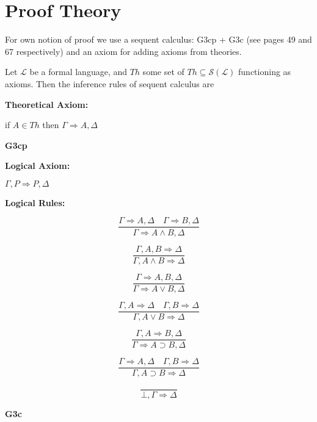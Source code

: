 \chapter{Proof Theory}\label{chapter:proof-theory}
For own notion of proof we use a sequent calculus: G3cp + G3c (see \cite{negri:2001} pages 49 and 67 respectively) and an axiom for adding axioms from theories.
\begin{definition}\label{def:Seq-Calc}
  \leanok
    Let $\mathcal{L}$ be a formal language, and $Th$ some set of $Th \subseteq \mathcal{S}(\mathcal{L})$ functioning as axioms. Then the inference rules of sequent calculus are

\noindent \textbf{Theoretical Axiom:}

if $A \in Th$ then $\Gamma \Rightarrow A, \Delta$

\begin{center}
    \textbf{G3cp}
\end{center}
\noindent \textbf{Logical Axiom:}

$\Gamma, P \Rightarrow P, \Delta$

\noindent \textbf{Logical Rules:}
\begin{multicols}{2}
\[
\frac{\Gamma \Rightarrow A, \Delta \quad \Gamma \Rightarrow B, \Delta}{\Gamma \Rightarrow A \land B, \Delta}\tag{$R\land$}
\]

\[
\frac{\Gamma, A, B \Rightarrow \Delta}{\Gamma, A \land B \Rightarrow \Delta}\tag{$L\land$}
\]

\[
\frac{\Gamma \Rightarrow A, B, \Delta}{\Gamma \Rightarrow A \lor B, \Delta}\tag{$R\lor$}
\]

\[
\frac{\Gamma, A \Rightarrow \Delta \quad \Gamma, B \Rightarrow \Delta}{\Gamma, A \lor B \Rightarrow \Delta}\tag{$L\lor$}
\]

\[
\frac{\Gamma, A \Rightarrow B, \Delta}{\Gamma \Rightarrow A \supset B, \Delta}\tag{$R\supset$}
\]

\[
\frac{\Gamma \Rightarrow A, \Delta \quad \Gamma, B \Rightarrow \Delta}{\Gamma, A \supset B \Rightarrow \Delta}\tag{$L\supset$}
\]

\[
\frac{}{\bot, \Gamma \Rightarrow \Delta}\tag{$L\bot$}
\]

\end{multicols}

\begin{center}
    \textbf{G3c}
\end{center}
\begin{multicols}{2}


\end{multicols}
\end{definition}
